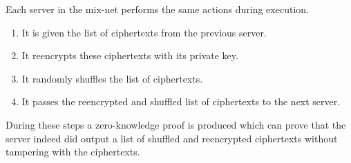 
Each server in the mix-net performs the same actions during execution.

\begin{enumerate}
\item It is given the list of ciphertexts from the previous server.
\item It reencrypts these ciphertexts with its private key.
\item It randomly shuffles the list of ciphertexts.
\item It passes the reencrypted and shuffled list of ciphertexts to the next server.
\end{enumerate}

During these steps a zero-knowledge proof is produced which can prove that the server indeed did output a list of shuffled and reencrypted ciphertexts without tampering with the ciphertexts.

\begin{center}
\end{center}

